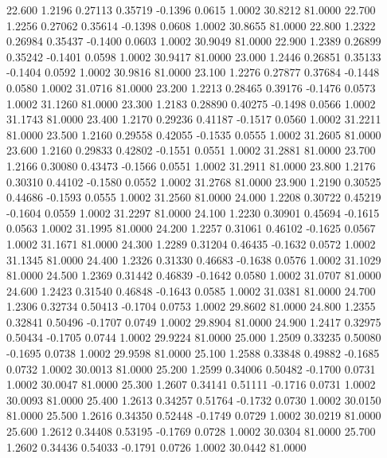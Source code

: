  22.600   1.2196   0.27113   0.35719  -0.1396   0.0615   1.0002  30.8212  81.0000
  22.700   1.2256   0.27062   0.35614  -0.1398   0.0608   1.0002  30.8655  81.0000
  22.800   1.2322   0.26984   0.35437  -0.1400   0.0603   1.0002  30.9049  81.0000
  22.900   1.2389   0.26899   0.35242  -0.1401   0.0598   1.0002  30.9417  81.0000
  23.000   1.2446   0.26851   0.35133  -0.1404   0.0592   1.0002  30.9816  81.0000
  23.100   1.2276   0.27877   0.37684  -0.1448   0.0580   1.0002  31.0716  81.0000
  23.200   1.2213   0.28465   0.39176  -0.1476   0.0573   1.0002  31.1260  81.0000
  23.300   1.2183   0.28890   0.40275  -0.1498   0.0566   1.0002  31.1743  81.0000
  23.400   1.2170   0.29236   0.41187  -0.1517   0.0560   1.0002  31.2211  81.0000
  23.500   1.2160   0.29558   0.42055  -0.1535   0.0555   1.0002  31.2605  81.0000
  23.600   1.2160   0.29833   0.42802  -0.1551   0.0551   1.0002  31.2881  81.0000
  23.700   1.2166   0.30080   0.43473  -0.1566   0.0551   1.0002  31.2911  81.0000
  23.800   1.2176   0.30310   0.44102  -0.1580   0.0552   1.0002  31.2768  81.0000
  23.900   1.2190   0.30525   0.44686  -0.1593   0.0555   1.0002  31.2560  81.0000
  24.000   1.2208   0.30722   0.45219  -0.1604   0.0559   1.0002  31.2297  81.0000
  24.100   1.2230   0.30901   0.45694  -0.1615   0.0563   1.0002  31.1995  81.0000
  24.200   1.2257   0.31061   0.46102  -0.1625   0.0567   1.0002  31.1671  81.0000
  24.300   1.2289   0.31204   0.46435  -0.1632   0.0572   1.0002  31.1345  81.0000
  24.400   1.2326   0.31330   0.46683  -0.1638   0.0576   1.0002  31.1029  81.0000
  24.500   1.2369   0.31442   0.46839  -0.1642   0.0580   1.0002  31.0707  81.0000
  24.600   1.2423   0.31540   0.46848  -0.1643   0.0585   1.0002  31.0381  81.0000
  24.700   1.2306   0.32734   0.50413  -0.1704   0.0753   1.0002  29.8602  81.0000
  24.800   1.2355   0.32841   0.50496  -0.1707   0.0749   1.0002  29.8904  81.0000
  24.900   1.2417   0.32975   0.50434  -0.1705   0.0744   1.0002  29.9224  81.0000
  25.000   1.2509   0.33235   0.50080  -0.1695   0.0738   1.0002  29.9598  81.0000
  25.100   1.2588   0.33848   0.49882  -0.1685   0.0732   1.0002  30.0013  81.0000
  25.200   1.2599   0.34006   0.50482  -0.1700   0.0731   1.0002  30.0047  81.0000
  25.300   1.2607   0.34141   0.51111  -0.1716   0.0731   1.0002  30.0093  81.0000
  25.400   1.2613   0.34257   0.51764  -0.1732   0.0730   1.0002  30.0150  81.0000
  25.500   1.2616   0.34350   0.52448  -0.1749   0.0729   1.0002  30.0219  81.0000
  25.600   1.2612   0.34408   0.53195  -0.1769   0.0728   1.0002  30.0304  81.0000
  25.700   1.2602   0.34436   0.54033  -0.1791   0.0726   1.0002  30.0442  81.0000
